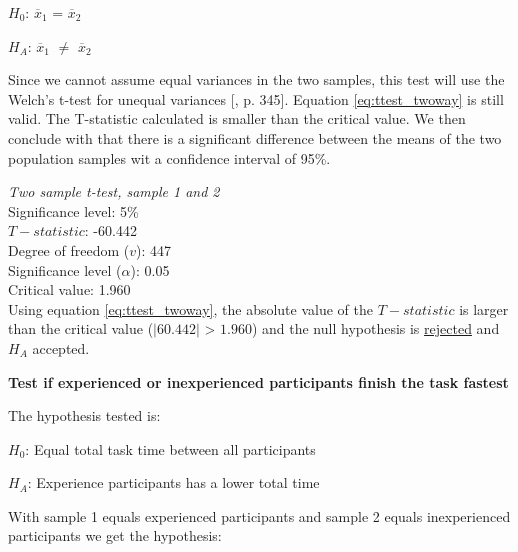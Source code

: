 \centerline{$H_{0}$: $\overline{x}_1$ = $\overline{x}_2$} 
\centerline{$H_{A}$: $\overline{x}_1$ $\neq$ $\overline{x}_2$}

\vspace{0.3cm}

Since we cannot assume equal variances in the two samples, this test will use the Welch's t-test for unequal variances [\citep{Walpole2012}, p. 345]. Equation \ref{eq:ttest_twoway} is still valid. The T-statistic calculated is smaller than the critical value. We then conclude with that there is a significant difference between the means of the two population samples wit a confidence interval of 95\%.\\[0.2cm]

 \begin{center}
	\begin{tcolorbox}[box align=center,width=\textwidth-5cm]
		\centering
		\textit{Two sample t-test, sample 1 and 2}\\
		Significance level: 5\%  \\[0.5cm]
		
		$T-statistic$: -60.442 \\
		Degree of freedom ($v$): 447 \\ %
		Significance level ($\alpha$): 0.05 \\
		Critical value: 1.960\\[0.2cm]
		
		Using equation \ref{eq:ttest_twoway}, the absolute value of the $T-statistic$ is larger than the critical value ($|60.442|$ > $1.960$) and the null hypothesis is \underline{rejected} and $H_A$ accepted.\\[0.5cm]

	\end{tcolorbox} 
\end{center}

\vspace{0.7cm}

\textbf{Test if  experienced or inexperienced participants finish the task fastest} 

The hypothesis tested is:\newline

\centerline{$H_{0}$: Equal total task time between all participants}
\centerline{$H_{A}$: Experience participants has a lower total time}

With sample 1 equals experienced participants and sample 2 equals inexperienced participants we get the hypothesis:\\[0.2cm]


